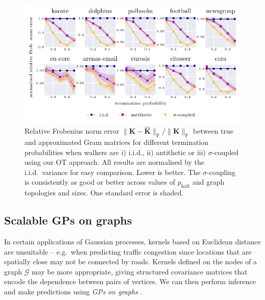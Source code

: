 \begin{figure} 
    \centering
    \includegraphics{images/grfs_more_graphs_14th_may.pdf}
    \caption{Relative Frobenius norm error $\|\mathbf{K} - \widehat{\mathbf{K}}\|_\textrm{F} / \| \mathbf{K} \|_\textrm{F}$ between true and approximated Gram matrices for different termination probabilities when walkers are i) i.i.d., ii) antithetic \citep{reid2023quasi} or iii) $\sigma$-coupled using our OT approach. 
    All results are normalised by the i.i.d.~variance for easy comparison. 
    Lower is better. 
    The $\sigma$-coupling is consistently as good or better across values of $p_\textrm{halt}$ and graph topologies and sizes.
    One standard error is shaded. \vspace{-5mm}}
    \label{fig:grfs_more_graphs}
\end{figure}

\subsection{Scalable GPs on graphs}
In certain applications of Gaussian processes, kernels based on Euclidean distance are unsuitable -- e.g.~when predicting traffic congestion since locations that are spatially close may not be connected by roads. 
Kernels defined on the nodes of a graph $\mathcal{G}$ may be more appropriate, giving structured covariance matrices that encode the dependence between pairs of vertices. 
We can then perform inference and make predictions using \emph{GPs on graphs} \citep{borovitskiy2021matern,zhi2023gaussian}.

